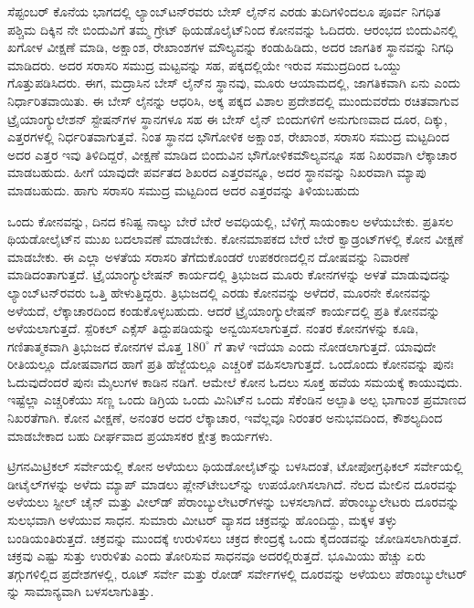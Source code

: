 ಸೆಪ್ಟಂಬರ್​ ಕೊನೆಯ ಭಾಗದಲ್ಲಿ ಲ್ಯಾಂಬ್​ಟನ್​ರವರು ಬೇಸ್​ ಲೈನ್​ನ ಎರಡು ತುದಿಗಳಿಂದಲೂ ಪೂರ್ವ ನಿಗಧಿತ ಪಶ್ಚಿಮ ದಿಕ್ಕಿನ ನೇ ಬಿಂದುವಿಗೆ ತಮ್ಮ ಗ್ರೇಟ್​ ಥಿಯಡೊಲೈಟ್​\break ನಿಂದ ಕೋನವನ್ನು ಓದಿದರು. ಆರಂಭದ ಬಿಂದುವಿನಲ್ಲಿ ಖಗೋಳ ವೀಕ್ಷಣೆ ಮಾಡಿ, ಅಕ್ಷಾಂಶ, ರೇಖಾಂಶಗಳ ಮೌಲ್ಯವನ್ನು ಕಂಡುಹಿಡಿದು, ಅದರ ಜಾಗತಿಕ ಸ್ಥಾನವನ್ನು ನಿಗಧಿ ಮಾಡಿದರು. ಅದರ ಸರಾಸರಿ ಸಮುದ್ರ ಮಟ್ಟವನ್ನು ಸಹ, ಪಕ್ಕದಲ್ಲಿಯೇ ಇರುವ ಸಮುದ್ರದಿಂದ ಒಯ್ದು ಗೊತ್ತುಪಡಿಸಿದರು. ಈಗ, ಮದ್ರಾಸಿನ ಬೇಸ್​ ಲೈನ್​ನ ಸ್ಥಾನವು, ಮೂರು ಆಯಾಮದಲ್ಲಿ, ಜಾಗತಿಕವಾಗಿ ಏನು ಎಂದು ನಿರ್ಧಾರಿತವಾಯಿತು. ಈ ಬೇಸ್​ ಲೈನನ್ನು ಆಧರಿಸಿ, ಅಕ್ಕ ಪಕ್ಕದ ವಿಶಾಲ ಪ್ರದೇಶದಲ್ಲಿ ಮುಂದುವರೆದು ರಚಿತವಾಗುವ ಟ್ರೈಯಾಂಗ್ಯುಲೇಶನ್​ ಸ್ಟೇಷನ್​ಗಳ ಸ್ಥಾನಗಳೂ ಸಹ ಈ ಬೇಸ್​ ಲೈನ್​ ಬಿಂದುಗಳಿಗೆ ಅನುಗುಣವಾದ ದೂರ, ದಿಕ್ಕು, ಎತ್ತರಗಳಲ್ಲಿ ನಿರ್ಧರಿತವಾಗುತ್ತವೆ. ನಿಂತ ಸ್ಥಾನದ ಭೌಗೋಳಿಕ ಅಕ್ಷಾಂಶ, ರೇಖಾಂಶ, ಸರಾಸರಿ ಸಮುದ್ರ ಮಟ್ಟದಿಂದ ಅದರ ಎತ್ತರ ಇವು ತಿಳಿದಿದ್ದರೆ, ವೀಕ್ಷಣೆ ಮಾಡಿದ ಬಿಂದುವಿನ ಭೌಗೋಳಿಕ\break ಮೌಲ್ಯವನ್ನೂ ಸಹ ನಿಖರವಾಗಿ ಲೆಕ್ಕಾಚಾರ ಮಾಡಬಹುದು. ಹೀಗೆ ಯಾವುದೇ ಪರ್ವತದ ಶಿಖರದ ಎತ್ತರವನ್ನೂ, ಅದರ ಸ್ಥಾನವನ್ನು ನಿಖರವಾಗಿ ಮ್ಯಾಪು ಮಾಡಬಹುದು. ಹಾಗು ಸರಾಸರಿ ಸಮುದ್ರ ಮಟ್ಟದಿಂದ ಅದರ ಎತ್ತರವನ್ನು ತಿಳಿಯಬಹುದು

\vskip 4pt

ಒಂದು ಕೋನವನ್ನು, ದಿನದ ಕನಿಷ್ಟ ನಾಲ್ಕು ಬೇರೆ ಬೇರೆ ಅವಧಿಯಲ್ಲಿ, ಬೆಳಿಗ್ಗೆ ಸಾಯಂಕಾಲ ಅಳೆಯಬೇಕು. ಪ್ರತಿಸಲ ಥಿಯಡೋಲೈಟ್​ನ ಮುಖ ಬದಲಾವಣೆ ಮಾಡಬೇಕು. ಕೋನಮಾಪಕದ ಬೇರೆ ಬೇರೆ ಕ್ವಾಡ್ರಂಟ್​ಗಳಲ್ಲಿ ಕೋನ ವೀಕ್ಷಣೆ ಮಾಡಬೇಕು. ಈ ಎಲ್ಲಾ ಅಳತೆಯ ಸರಾಸರಿ ತೆಗೆದುಕೊಂಡರೆ ಉಪಕರಣದಲ್ಲಿನ ದೋಷವನ್ನು ನಿವಾರಣೆ ಮಾಡಿದಂತಾಗುತ್ತದೆ. ಟ್ರೈಯಾಂಗ್ಯುಲೇಷನ್​ ಕಾರ್ಯದಲ್ಲಿ ತ್ರಿಭುಜದ ಮೂರು ಕೋನಗಳನ್ನು ಅಳತೆ ಮಾಡುವುದನ್ನು ಲ್ಯಾಂಬ್​ಟನ್​ರವರು ಒತ್ತಿ ಹೇಳುತ್ತಿದ್ದರು. ತ್ರಿಭುಜದಲ್ಲಿ ಎರಡು ಕೋನವನ್ನು ಅಳೆದರೆ, ಮೂರನೇ ಕೋನವನ್ನು ಅಳೆಯದೆ, ಲೆಕ್ಕಾಚಾರದಿಂದ ಕಂಡುಕೊಳ್ಳಬಹುದು. ಆದರೆ ಟ್ರೈಯಾಂಗ್ಯುಲೇಷನ್​ ಕಾರ್ಯದಲ್ಲಿ ಪ್ರತಿ ಕೋನವನ್ನು ಅಳೆಯಲಾಗುತ್ತದೆ. ಸ್ಪೆರಿಕಲ್​ ಎಕ್ಸೆಸ್​ ತಿದ್ದುಪಡಿಯನ್ನು ಅನ್ವಯಿಸಲಾಗುತ್ತದೆ. ನಂತರ  ಕೋನಗಳನ್ನು ಕೂಡಿ, ಗಣಿತಾತ್ಮಕವಾಗಿ ತ್ರಿಭುಜದ  ಕೋನಗಳ ಮೊತ್ತ $180^\circ$ ಗೆ ತಾಳೆ ಇದೆಯಾ ಎಂದು ನೋಡಲಾಗುತ್ತದೆ. ಯಾವುದೇ ರೀತಿಯಲ್ಲೂ ದೋಷವಾಗದ ಹಾಗೆ ಪ್ರತಿ ಹೆಜ್ಜೆಯಲ್ಲೂ ಎಚ್ಚರಿಕೆ ವಹಿಸಲಾಗುತ್ತದೆ. ಒಂದೊಂದು ಕೋನವನ್ನು ಪುನಃ ಓದುವುದೆಂದರೆ ಪುನಃ  ಮೈಲುಗಳ ಕಾಡಿನ ನಡಿಗೆ. ಆಮೇಲೆ ಕೋನ ಓದಲು ಸೂಕ್ತ ಹವೆಯ ಸಮಯಕ್ಕೆ ಕಾಯುವುದು. ಇಷ್ಟೆಲ್ಲಾ ಎಚ್ಚರಿಕೆಯು ಸಣ್ಣ ಒಂದು ಡಿಗ್ರಿಯ ಒಂದು ಮಿನಿಟ್​ನ ಒಂದು ಸೆಕೆಂಡಿನ ಅಲ್ಪಾತಿ ಅಲ್ಪ ಭಾಗಾಂಶ ಪ್ರಮಾಣದ ನಿಖರತೆಗಾಗಿ. ಕೋನ ವೀಕ್ಷಣೆ, ಅನಂತರ ಅದರ ಲೆಕ್ಕಾಚಾರ, ಇವೆಲ್ಲವೂ ನಿರಂತರ ಅನುಭವದಿಂದ, ಕೌಶಲ್ಯದಿಂದ ಮಾಡಬೇಕಾದ ಬಹು ದೀರ್ಘವಾದ ಪ್ರಯಾಸಕರ ಕ್ಷೇತ್ರ ಕಾರ್ಯಗಳು.

\newpage

ಟ್ರಿಗನಮಿಟ್ರಿಕಲ್​ ಸರ್ವೇಯಲ್ಲಿ ಕೋನ ಅಳೆಯಲು ಥಿಯಡೋಲೈಟ್​ನ್ನು ಬಳಸಿದಂತೆ, ಟೋಪೋಗ್ರಫಿಕಲ್​ ಸರ್ವೇಯಲ್ಲಿ ಡೀಟೈಲ್​ಗಳನ್ನು ಅಳೆದು ಮ್ಯಾಪ್​ ಮಾಡಲು ಪ್ಲೇನ್​\break ಟೇಬಲ್​ನ್ನು ಉಪಯೋಗಿಸಲಾಗಿದೆ. ನೆಲದ ಮೇಲಿನ ದೂರವನ್ನು ಅಳೆಯಲು ಸ್ಟೀಲ್​ ಚೈನ್​ ಮತ್ತು ವೀಲ್​ಡ್​ ಪೆರಾಂಬ್ಯುಲೇಟರ್​ಗಳನ್ನು ಬಳಸಲಾಗಿದೆ. ಪೆರಾಂಬ್ಯುಲೇಟರು ದೂರವನ್ನು ಸುಲಭವಾಗಿ ಅಳೆಯುವ ಸಾಧನ. ಸುಮಾರು  ಮೀಟರ್​ ವ್ಯಾಸದ ಚಕ್ರವನ್ನು ಹೊಂದಿದ್ದು, ಮಕ್ಕಳ ತಳ್ಳು ಬಂಡಿಯಂತಿರುತ್ತದೆ. ಚಕ್ರವನ್ನು ಮುಂದಕ್ಕೆ ಉರುಳಿಸಲು ಚಕ್ರದ ಕೇಂದ್ರಕ್ಕೆ ಒಂದು ಕೈದಂಡವನ್ನು ಜೋಡಿಸಲಾಗಿರುತ್ತದೆ. ಚಕ್ರವು ಎಷ್ಟು ಸುತ್ತು ಉರುಳಿತು ಎಂದು ತೋರಿಸುವ ಸಾಧನವೂ ಅದರಲ್ಲಿರುತ್ತದೆ. ಭೂಮಿಯು ಹೆಚ್ಚು ಏರು ತಗ್ಗುಗಳಿಲ್ಲಿದ ಪ್ರದೇಶಗಳಲ್ಲಿ, ರೂಟ್​ ಸರ್ವೇ ಮತ್ತು ರೋಡ್​ ಸರ್ವೇಗಳಲ್ಲಿ ದೂರವನ್ನು ಅಳೆಯಲು ಪೆರಾಂಬ್ಯುಲೇಟರ್​ನ್ನು ಸಾಮಾನ್ಯವಾಗಿ ಬಳಸಲಾಗುತಿತ್ತು.

